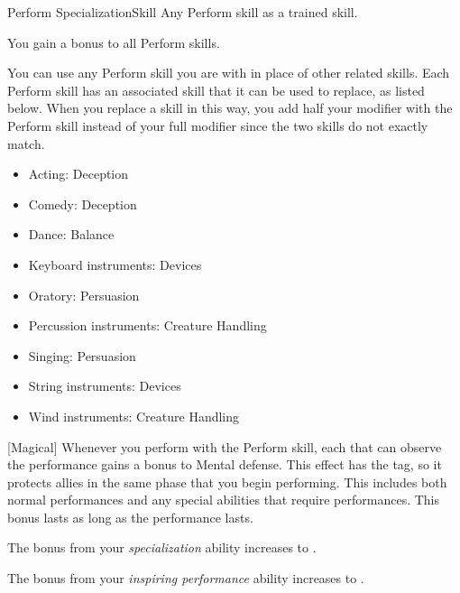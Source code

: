     \begin{feat}{Perform Specialization}{Skill}
        \featpre Any Perform skill as a trained skill.

         You gain a  bonus to all Perform skills.

         You can use any Perform skill you are  with in place of other related skills.
        Each Perform skill has an associated skill that it can be used to replace, as listed below.
        When you replace a skill in this way, you add half your modifier with the Perform skill instead of your full modifier since the two skills do not exactly match.
        \begin{itemize}
            \item Acting: Deception
            \item Comedy: Deception
            \item Dance: Balance
            \item Keyboard instruments: Devices
            \item Oratory: Persuasion
            \item Percussion instruments: Creature Handling
            \item Singing: Persuasion
            \item String instruments: Devices
            \item Wind instruments: Creature Handling
        \end{itemize}

        [Magical] Whenever you perform with the Perform skill, each  that can observe the performance gains a  bonus to Mental defense.
        This effect has the  tag, so it protects allies in the same phase that you begin performing.
        This includes both normal performances and any special abilities that require performances.
        This bonus lasts as long as the performance lasts.

         The bonus from your \textit{specialization} ability increases to .

         The bonus from your \textit{inspiring performance} ability increases to .
    \end{feat}

